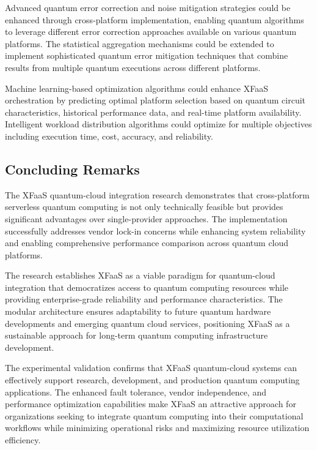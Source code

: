 \documentclass[onecolumn]{IEEEtran}
\begin{document}
Advanced quantum error correction and noise mitigation strategies could be enhanced through cross-platform implementation, enabling quantum algorithms to leverage different error correction approaches available on various quantum platforms. The statistical aggregation mechanisms could be extended to implement sophisticated quantum error mitigation techniques that combine results from multiple quantum executions across different platforms.

Machine learning-based optimization algorithms could enhance XFaaS orchestration by predicting optimal platform selection based on quantum circuit characteristics, historical performance data, and real-time platform availability. Intelligent workload distribution algorithms could optimize for multiple objectives including execution time, cost, accuracy, and reliability.

\subsection{Concluding Remarks}

The XFaaS quantum-cloud integration research demonstrates that cross-platform serverless quantum computing is not only technically feasible but provides significant advantages over single-provider approaches. The implementation successfully addresses vendor lock-in concerns while enhancing system reliability and enabling comprehensive performance comparison across quantum cloud platforms.

The research establishes XFaaS as a viable paradigm for quantum-cloud integration that democratizes access to quantum computing resources while providing enterprise-grade reliability and performance characteristics. The modular architecture ensures adaptability to future quantum hardware developments and emerging quantum cloud services, positioning XFaaS as a sustainable approach for long-term quantum computing infrastructure development.

The experimental validation confirms that XFaaS quantum-cloud systems can effectively support research, development, and production quantum computing applications. The enhanced fault tolerance, vendor independence, and performance optimization capabilities make XFaaS an attractive approach for organizations seeking to integrate quantum computing into their computational workflows while minimizing operational risks and maximizing resource utilization efficiency.


\end{document}
